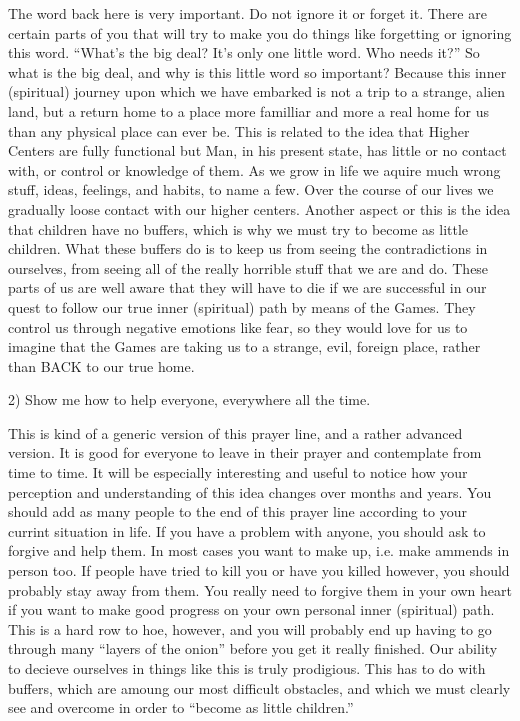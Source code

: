 \documentclass[12pt,letterpaper]{book}
\begin{document}
The word back here is very important. Do not ignore it or forget it. There are certain parts of you that will try to make you do things like forgetting or ignoring this word. ``What's the big deal? It's only one little word. Who needs it?'' So what is the big deal, and why is this little word so important? Because this inner (spiritual) journey upon which we have embarked is not a trip to a strange, alien land, but a return home to a place more familliar and more a real home for us than any physical place can ever be. This is related to the idea that Higher Centers are fully functional but Man, in his present state, has little or no contact with, or control or knowledge of them. As we grow in life we aquire much wrong stuff, ideas, feelings, and habits, to name a few. Over the course of our lives we gradually loose contact with our higher centers. Another aspect or this is the idea that children have no buffers, which is why we must try to become as little children. What these buffers do is to keep us from seeing the contradictions in ourselves, from seeing all of the really horrible stuff that we are and do. These parts of us are well aware that they will have to die if we are successful in our quest to follow our true inner (spiritual) path by means of the Games. They control us through negative emotions like fear, so they would love for us to imagine that the Games are taking us to a strange, evil, foreign place, rather than BACK to our true home.

2) Show me how to help everyone, everywhere all the time.

This is kind of a generic version of this prayer line, and a rather advanced version. It is good for everyone to leave in their prayer and contemplate from time to time. It will be especially interesting and useful to notice how your perception and understanding of this idea changes over months and years. You should add as many people to the end of this prayer line according to your currint situation in life. If you have a problem with anyone, you should ask to forgive and help them. In most cases you want to make up, i.e. make ammends in person too. If people have tried to kill you or have you killed however, you should probably stay away from them. You really need to forgive them in your own heart if you want to make good progress on your own personal inner (spiritual) path. This is a hard row to hoe, however, and you will probably end up having to go through many ``layers of the onion'' before you get it really finished. Our ability to decieve ourselves in things like this is truly prodigious. This has to do with buffers, which are amoung our most difficult obstacles, and which we must clearly see and overcome in order to ``become as little children.''
\end{document}
